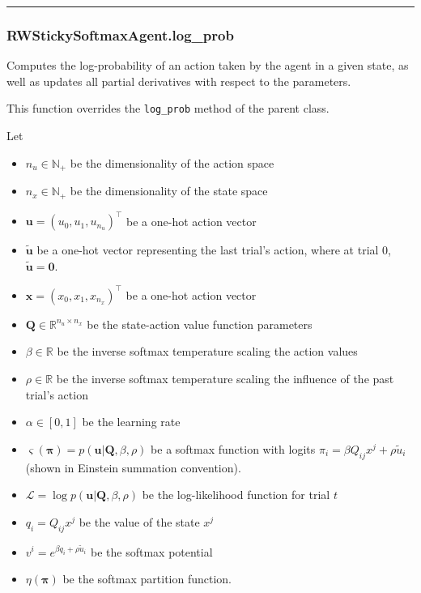 \begin{center}\rule{0.5\linewidth}{\linethickness}\end{center}

\subsubsection{RWStickySoftmaxAgent.log\_prob}\label{rwstickysoftmaxagent.log_prob}

\begin{Shaded}
\begin{Highlighting}[]
\end{Highlighting}
\end{Shaded}

Computes the log-probability of an action taken by the agent in a given
state, as well as updates all partial derivatives with respect to the
parameters.

This function overrides the \texttt{log\_prob} method of the parent
class.

Let

\begin{itemize}
\tightlist
\item
  \(n_u \in \mathbb N_+\) be the dimensionality of the action space
\item
  \(n_x \in \mathbb N_+\) be the dimensionality of the state space
\item
  \(\mathbf u = (u_0, u_1, u_{n_u})^\top\) be a one-hot action vector
\item
  \(\tilde{\mathbf u}\) be a one-hot vector representing the last
  trial's action, where at trial 0, \(\tilde{\mathbf u} = \mathbf 0\).
\item
  \(\mathbf x = (x_0, x_1, x_{n_x})^\top\) be a one-hot action vector
\item
  \(\mathbf Q \in \mathbb R^{n_u \times n_x}\) be the state-action value
  function parameters
\item
  \(\beta \in \mathbb R\) be the inverse softmax temperature scaling the
  action values
\item
  \(\rho \in \mathbb R\) be the inverse softmax temperature scaling the
  influence of the past trial's action
\item
  \(\alpha \in [0, 1]\) be the learning rate
\item
  \(\varsigma(\boldsymbol\pi) = p(\mathbf u | \mathbf Q, \beta, \rho)\)
  be a softmax function with logits
  \(\pi_i = \beta Q_{ij} x^j + \rho \tilde{u}_i\) (shown in Einstein
  summation convention).
\item
  \(\mathcal L = \log p(\mathbf u | \mathbf Q, \beta, \rho)\) be the
  log-likelihood function for trial \(t\)
\item
  \(q_i = Q_{ij} x^j\) be the value of the state \(x^j\)
\item
  \(v^i = e^{\beta q_i + \rho \tilde{u}_i}\) be the softmax potential
\item
  \(\eta(\boldsymbol\pi)\) be the softmax partition function.
\end{itemize}

